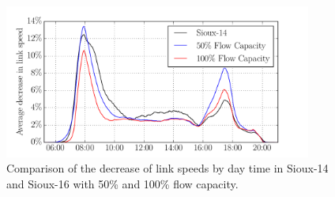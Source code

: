 \begin{figure}
    \centering
    \includegraphics[width=0.9\textwidth]{figures/sioux_speeds.pdf}
    \caption{Comparison of the decrease of link speeds by day time in Sioux-14 and Sioux-16 with 50\% and 100\% flow capacity.}
    \label{fig:sioux_speeds}
\end{figure}


